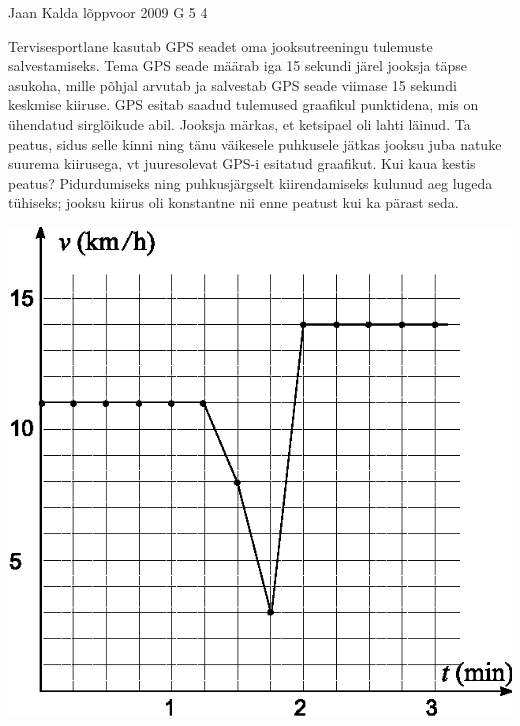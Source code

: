 \documentclass[11pt]{article}
\begin{document}
{%
{Jaan Kalda} %
{lõppvoor} %
{2009} %
{G 5} %
{4} %
{
\ifStatement
Tervisesportlane kasutab GPS seadet oma jooksutreeningu tulemuste salvestamiseks.
Tema GPS seade määrab iga 15 sekundi järel jooksja täpse asukoha, mille põhjal arvutab ja salvestab GPS seade viimase 15 sekundi keskmise kiiruse.
GPS esitab saadud tulemused graafikul punktidena, mis on ühendatud sirglõikude abil.
Jooksja märkas, et ketsipael oli lahti läinud.
Ta peatus, sidus selle kinni ning tänu väikesele puhkusele jätkas jooksu juba natuke suurema
kiirusega, vt juuresolevat GPS-i esitatud graafikut. Kui kaua kestis peatus? Pidurdumiseks ning puhkusjärgselt kiirendamiseks kulunud
aeg lugeda tühiseks; jooksu kiirus oli konstantne nii enne peatust kui ka pärast seda.

\begin{center}
\includegraphics{2009-v3g-05-gps.eps}
\end{center}
\fi
}

}
\end{document}
